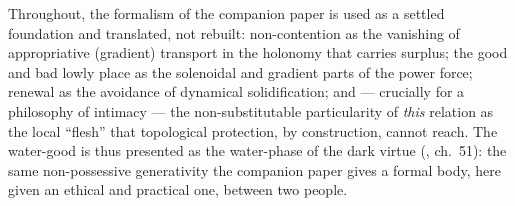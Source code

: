 Throughout, the formalism of the companion paper is used as a settled foundation and translated, not rebuilt: non-contention as the vanishing of appropriative (gradient) transport in the holonomy that carries surplus; the good and bad lowly place as the solenoidal and gradient parts of the power force; renewal as the avoidance of dynamical solidification; and --- crucially for a philosophy of intimacy --- the non-substitutable particularity of \emph{this} relation as the local ``flesh'' that topological protection, by construction, cannot reach. The water-good is thus presented as the water-phase of the dark virtue (, ch.~51): the same non-possessive generativity the companion paper gives a formal body, here given an ethical and practical one, between two people.
